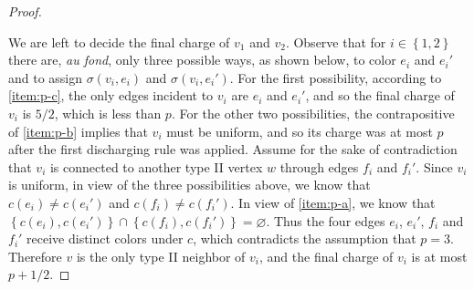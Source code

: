 \documentclass[11pt]{article}
\theoremstyle{definition}
\theoremstyle{remark}
\newcommand{\sset}[1]{\left\{{#1}\right\}}
\begin{document}
\begin{proof}
\begin{figure}[ht]
\quad%
    \end{figure}
    
    We are left to decide the final charge of $v_1$ and $v_2$. Observe that for $i \in \sset{1,2}$ there are, \emph{au fond}, only three possible ways, as shown below, to color $e_i$ and $e_i'$ and to assign $\sigma(v_i, e_i)$ and $\sigma(v_i, e_i')$. For the first possibility, according to \ref{item:p-c}, the only edges incident to $v_i$ are $e_i$ and $e_i'$, and so the final charge of $v_i$ is $5/2$, which is less than $p$. For the other two possibilities, the contrapositive of \ref{item:p-b} implies that $v_i$ must be uniform, and so its charge was at most $p$ after the first discharging rule was applied. Assume for the sake of contradiction that $v_i$ is connected to another type II vertex $w$ through edges $f_i$ and $f_i'$. Since $v_i$ is uniform, in view of the three possibilities above, we know that $c(e_i) \neq c(e_i')$ and $c(f_i) \neq c(f_i')$. In view of \ref{item:p-a}, we know that $\sset{c(e_i), c(e_i')} \cap \sset{c(f_i), c(f_i')} = \varnothing$. Thus the four edges $e_i$, $e_i'$, $f_i$ and $f_i'$ receive distinct colors under $c$, which contradicts the assumption that $p = 3$. Therefore $v$ is the only type II neighbor of $v_i$, and the final charge of $v_i$ is at most $p + 1/2$.


\end{proof}
\end{document}
